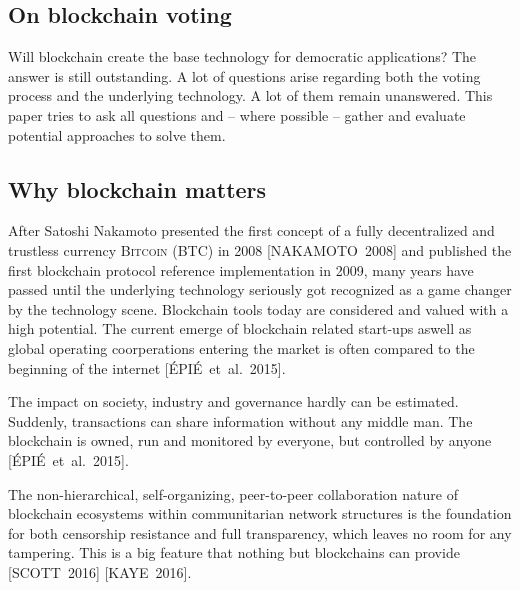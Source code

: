 \documentclass[9pt,oneside]{amsart}
\begin{document}
\begin{multicols}{2}
\section{On blockchain voting}
Will blockchain create the base technology for democratic applications? The answer is still outstanding. A lot of questions arise regarding both the voting process and the underlying technology. A lot of them remain unanswered. This paper tries to ask all questions and -- where possible -- gather and evaluate potential approaches to solve them.

\subsection{Why blockchain matters}
After Satoshi Nakamoto presented the first concept of a fully decentralized and trustless currency \textsc{Bitcoin (BTC)} in 2008 [NAKAMOTO~2008] and published the first blockchain protocol reference implementation in 2009, many years have passed until the underlying technology seriously got recognized as a game changer by the technology scene. Blockchain tools today are considered and valued with a high potential. The current emerge of blockchain related start-ups aswell as global operating coorperations entering the market is often compared to the beginning of the internet [ÉPIÉ~et~al.~2015].\par
The impact on society, industry and governance hardly can be estimated. Suddenly, transactions can share information without any middle man. The blockchain is owned, run  and monitored by everyone, but controlled by anyone [ÉPIÉ~et~al.~2015].\par
The non-hierarchical, self-organizing, peer-to-peer collaboration nature of blockchain ecosystems within communitarian network structures is the foundation for both censorship resistance and full transparency, which leaves no room for any tampering. This is a big feature that nothing but blockchains can provide [SCOTT~2016] [KAYE~2016].


\end{multicols}
\end{document}
